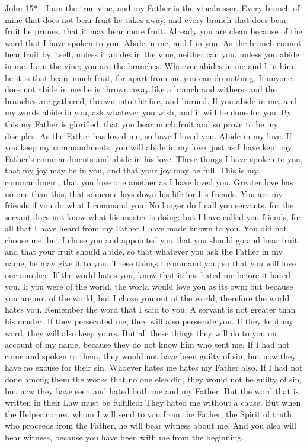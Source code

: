\documentclass[11pt]{article}
\begin{document}
John 15* - I am the true vine, and my Father is the vinedresser.  Every branch of mine that does not bear fruit he takes away, and every branch that does bear fruit he prunes, that it may bear more fruit.  Already you are clean because of the word that I have spoken to you.  Abide in me, and I in you. As the branch cannot bear fruit by itself, unless it abides in the vine, neither can you, unless you abide in me.  I am the vine; you are the branches. Whoever abides in me and I in him, he it is that bears much fruit, for apart from me you can do nothing.  If anyone does not abide in me he is thrown away like a branch and withers; and the branches are gathered, thrown into the fire, and burned.  If you abide in me, and my words abide in you, ask whatever you wish, and it will be done for you.  By this my Father is glorified, that you bear much fruit and so prove to be my disciples.  As the Father has loved me, so have I loved you. Abide in my love.  If you keep my commandments, you will abide in my love, just as I have kept my Father's commandments and abide in his love.  These things I have spoken to you, that my joy may be in you, and that your joy may be full.  This is my commandment, that you love one another as I have loved you.  Greater love has no one than this, that someone lays down his life for his friends.  You are my friends if you do what I command you.  No longer do I call you servants, for the servant does not know what his master is doing; but I have called you friends, for all that I have heard from my Father I have made known to you.  You did not choose me, but I chose you and appointed you that you should go and bear fruit and that your fruit should abide, so that whatever you ask the Father in my name, he may give it to you.  These things I command you, so that you will love one another.  If the world hates you, know that it has hated me before it hated you.  If you were of the world, the world would love you as its own; but because you are not of the world, but I chose you out of the world, therefore the world hates you.  Remember the word that I said to you: A servant is not greater than his master. If they persecuted me, they will also persecute you. If they kept my word, they will also keep yours.  But all these things they will do to you on account of my name, because they do not know him who sent me.  If I had not come and spoken to them, they would not have been guilty of sin, but now they have no excuse for their sin.  Whoever hates me hates my Father also.  If I had not done among them the works that no one else did, they would not be guilty of sin, but now they have seen and hated both me and my Father.  But the word that is written in their Law must be fulfilled: They hated me without a cause.  But when the Helper comes, whom I will send to you from the Father, the Spirit of truth, who proceeds from the Father, he will bear witness about me.  And you also will bear witness, because you have been with me from the beginning.
\end{document}
